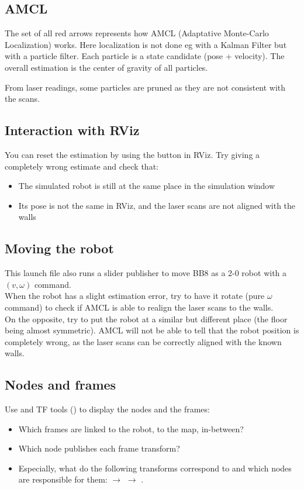 \documentclass{ecnreport}
\begin{document}
\subsection{AMCL}

The set of all red arrows represents how AMCL (Adaptative Monte-Carlo Localization) works. Here localization is not done eg with a Kalman Filter but with a particle filter. Each particle is a state candidate (pose + velocity). The overall estimation is the center of gravity of all particles.

From laser readings, some particles are pruned as they are not consistent with the scans.

\subsection{Interaction with RViz}

You can reset the estimation by using the  button in RViz. Try giving a completely wrong estimate and check that:
\begin{itemize}
 \item The simulated robot is still at the same place in the simulation window
 \item Its pose is not the same in RViz, and the laser scans are not aligned with the walls
\end{itemize}

\subsection{Moving the robot}

This launch file also runs a slider publisher to move BB8 as a 2-0 robot with a $(v,\omega)$ command.\\
When the robot has a slight estimation error, try to have it rotate (pure $\omega$ command) to check if AMCL is able to realign the laser scans to the walls. \\
On the opposite, try to put the robot at a similar but different place (the floor being almost symmetric).
AMCL will not be able to tell that the robot position is completely wrong, as the laser scans can be correctly aligned with the known walls.

\subsection{Nodes and frames}

Use  and TF tools () to display the nodes and the frames:
\begin{itemize}
 \item Which frames are linked to the robot, to the map, in-between?
 \item Which node publishes each frame transform?
 \item Especially, what do the following transforms correspond to and which nodes are responsible for them:
  $\rightarrow$  $\rightarrow$ .
\end{itemize}
\end{document}
